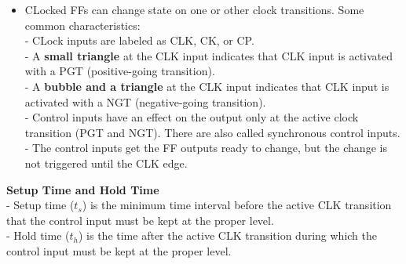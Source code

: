 \documentclass[12pt]{article}
\begin{document}
\begin{itemize}
	\item CLocked FFs can change state on one or other clock transitions. Some common characteristics: \\
	- CLock inputs are labeled as CLK, CK, or CP.\\
	- A \textbf{small triangle} at the CLK input indicates that CLK input is activated with a PGT (positive-going transition). \\
	- A \textbf{bubble and a triangle} at the CLK input indicates that CLK input is activated with a NGT (negative-going transition). \\
	- Control inputs have an effect on the output only at the active clock transition (PGT and NGT). There are also called synchronous control inputs. \\
	- The control inputs get the FF outputs ready to change, but the change is not triggered until the CLK edge.
\end{itemize}
\bigbreak
\textbf{Setup Time and Hold Time} \\
- Setup time ($t_s$) is the minimum time interval before the active CLK transition that the control input must be kept at the proper level. \\
- Hold time ($t_h$) is the time after the active CLK transition during which the control input must be kept at the proper level.
\end{document}
